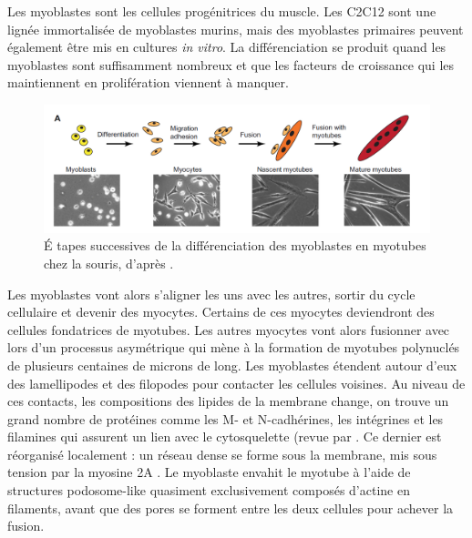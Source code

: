 Les myoblastes sont les cellules progénitrices du muscle. Les C2C12 sont une lignée immortalisée de myoblastes murins, mais des myoblastes primaires peuvent également être mis en cultures \textit{in vitro}.
La différenciation se produit quand les myoblastes sont suffisamment nombreux et que les facteurs de croissance qui les maintiennent en prolifération viennent à manquer. 
\begin{figure}
\includegraphics[scale=0.4]{Figures/Myoblast_fusion.png} 
\caption{\'E tapes successives de la différenciation des myoblastes en myotubes chez la souris, d'après \cite{abmayr_myoblast_2012}. }
\end{figure}

Les myoblastes vont alors s'aligner les uns avec les autres, sortir du cycle cellulaire et devenir des myocytes. Certains de ces myocytes deviendront des cellules fondatrices de myotubes. Les autres myocytes vont alors fusionner avec lors d'un processus asymétrique qui mène à la formation de myotubes polynuclés de plusieurs centaines de microns de long. 
Les myoblastes étendent autour d'eux des lamellipodes et des filopodes pour contacter les cellules voisines. Au niveau de ces contacts, les compositions des lipides de la membrane change, on trouve un grand nombre de protéines comme les M- et N-cadhérines, les intégrines et les filamines qui assurent un lien avec le cytosquelette (revue par \cite{abmayr_myoblast_2012}. Ce dernier est réorganisé localement : un réseau dense se forme sous la membrane, mis sous tension par la myosine 2A \cite{duan_dependence_2009}. 
Le myoblaste envahit le myotube à l'aide de structures podosome-like quasiment exclusivement composés d'actine en filaments, avant que des pores se forment entre les deux cellules pour achever la fusion. 



